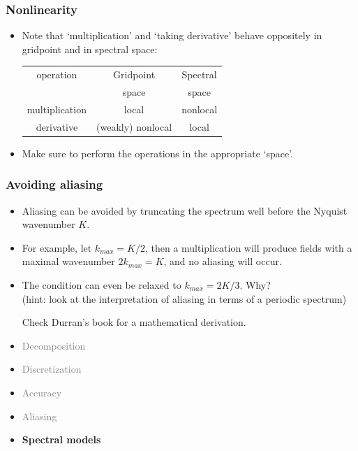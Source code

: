 \documentclass[aspectratio=43,9pt]{beamer}
\begin{document}
%
%
\begin{frame}
	\frametitle{Nonlinearity}
	\vfill\begin{itemize}
		\item Note that `multiplication' and `taking derivative' behave oppositely in gridpoint and in spectral space:\vfill
			\begin{center}
				\def\arraystretch{1.5}
				\begin{tabular}{c|cc}
					operation	&	Gridpoint	&	Spectral	\\[-1.8ex]
										& space & space	\\
				\hline\hline
					multiplication	&	local	&	nonlocal	\\
					derivative	&	(weakly) nonlocal	&	local	\\
				\end{tabular}
				\def\arraystretch{1}
			\end{center}\vfill
		\item Make sure to perform the operations in the appropriate `space'.
	\end{itemize}\vfill
\end{frame}
%
%
\begin{frame}
	\frametitle{Avoiding aliasing}
	\vfill\begin{itemize}
		\item Aliasing can be avoided by truncating the spectrum well before the Nyquist wavenumber $K$.\vfill
		\item For example, let $k_{max}=K/2$, then a multiplication will produce fields with a maximal wavenumber $2k_{max}=K$, and no aliasing will occur.\vfill
		\item The condition can even be relaxed to $k_{max}=2K/3$. Why?\\
			(hint: look at the interpretation of aliasing in terms of a periodic spectrum)
			\vfill\par
			Check Durran's book for a mathematical derivation.
	\end{itemize}\vfill
\end{frame}
%
%
\begin{frame}
	\begin{itemize}
		\item \textcolor{gray}{Decomposition}
		\item \textcolor{gray}{Discretization}
		\item \textcolor{gray}{Accuracy}
		\item \textcolor{gray}{Aliasing}
		\item {\bfseries Spectral models}
	\end{itemize}
\end{frame}
\end{document}

